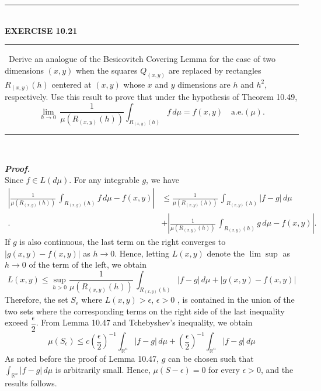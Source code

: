\documentclass[a4paper,11pt]{article}
\begin{document}
	\begin{flushleft}
		\rule[-0.5ex]{17cm}{2pt}\\
			\textbf{EXERCISE 10.21}\\
		\rule[1.5ex]{17cm}{0.5pt}\
			Derive an analogue of the Besicovitch Covering Lemma for the case of two dimensions $(x,y)$ when the squares $Q_{(x,y)}$ are replaced by rectangles $R_{(x,y)}(h)$ centered at $(x,y)$ whose $x$ and $y$ dimensions are $h$ and $h^2$, respectively. Use this result to prove that under the hypothesis of Theorem 10.49,
				$$\underset{h \to 0}{\lim}\,\frac{1}{\mu(R_{(x,y)}(h))} \int_{R_{(x,y)}(h)} f\,d\mu = f(x,y) \quad \text{a.e.}(\mu).$$
		\rule[1.0ex]{17cm}{0.5pt}\
	\end{flushleft}
	\textit{\textbf {Proof.}}\\
		Since $f \in L(d\mu)$. For any integrable $g$, we have
			$$\begin{aligned}
			\left| \frac{1}{\mu(R_{(x,y)}(h))} \,\int_{R_{(x,y)}(h)} f \,d\mu - f(x,y) \right|
			&\leq \frac{1}{\mu(R_{(x,y)}(h))} \,\int_{R_{(x,y)}(h)} |f-g|\,d\mu\\
			.\quad &+ \left| \frac{1}{\mu(R_{(x,y)}(h))} \,\int_{R_{(x,y)}(h)} g\,d\mu - f(x,y)\right|.
			\end{aligned}$$
		If $g$ is also continuous, the last term on the right converges to $|g(x,y) - f(x,y)|$ as $h \to 0$. Hence, letting $L(x,y)$ denote the $\lim \sup$ as $h \to 0$ of the term of the left, we obtain
			$$L(x,y)
			\leq \underset{h > 0}{\sup} \frac{1}{\mu(R_{(x,y)}(h))} \,\int_{R_{(x,y)}(h)} |f-g|\,d\mu
			+ |g(x,y) - f(x,y)|$$
		Therefore, the set $S_\epsilon$ where $L(x,y) > \epsilon$, $\epsilon > 0$ , is contained in the union of the two sets where the corresponding terms on the right side of the last inequality exceed $\dfrac{\epsilon}{2}$. From Lemma 10.47 and Tchebyshev's inequality, we obtain
			$$\mu(S_\epsilon)
			\leq c \left(\frac{\epsilon}{2}\right)^{-1} \int_{\mathbb{R}^n} |f - g|\,d\mu + \left(\frac{\epsilon}{2}\right)^{-1} \int_{\mathbb{R}^n} |f - g|\,d\mu$$
		As noted before the proof of Lemma 10.47, $g$ can be chosen such that $\int_{\mathbb{R}^n} |f - g|\,d\mu$ is arbitrarily small. Hence, $\mu(S-\epsilon) = 0$ for every $\epsilon > 0$, and the results follows.\\
\end{document}
